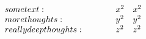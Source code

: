 \documentclass[17pt]{extarticle}
\begin{document}
\begin{equation*}
    \begin{array}{l l l}
       some text:            & x^2 & x^2 \\
       more thoughts:        & y^2 & y^2 \\
       really deep thoughts:\quad \quad \quad  & z^2 & z^2
    \end{array}
\end{equation*}
\end{document}
